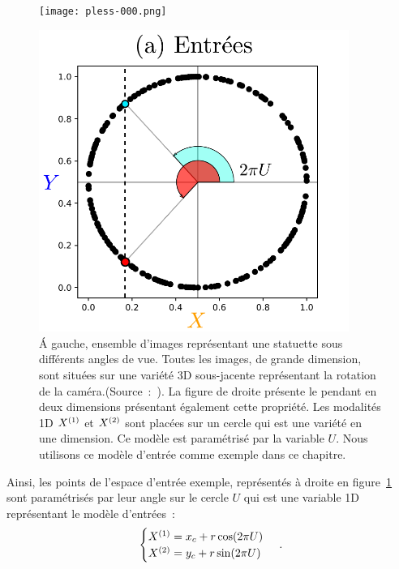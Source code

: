 \documentclass[../main]{subfiles}
\begin{document}
\begin{figure}
    \begin{minipage}{0.4\textwidth}
    \centering
    \texttt{[image: pless-000.png]}
    \end{minipage}
    \begin{minipage}{0.6\textwidth}
    \centering
    \includegraphics[width=0.9\textwidth]{2som_inp.pdf}
    \end{minipage}
    \caption{
        \'A gauche, ensemble d'images représentant une statuette sous différents angles de vue. Toutes les images, de grande dimension, sont situées sur une variété 3D sous-jacente représentant la rotation de la caméra.(Source~:~\cite{Pless2009ASO}).
       La figure de droite présente le pendant en deux dimensions présentant également cette propriété. Les modalités 1D $X^{({1})}$ et $X^{({2})}$ sont placées sur un cercle qui est une variété en une dimension. Ce modèle est paramétrisé par la variable $U$. Nous utilisons ce modèle d'entrée comme exemple dans ce chapitre.
       \label{fig:U}}
\end{figure}

Ainsi, les points de l'espace d'entrée exemple, représentés à droite en figure~\ref{fig:U} sont paramétrisés par leur angle sur le cercle $U$ qui est une variable 1D représentant le modèle d'entrées~:
\begin{equation}
 \begin{cases}
     X^{({1})}= x_c + r  \cos(2\pi U)\\
     X^{({2})} = y_c + r \sin(2 \pi U)
    \end{cases}\,.
\end{equation}
\end{document}
